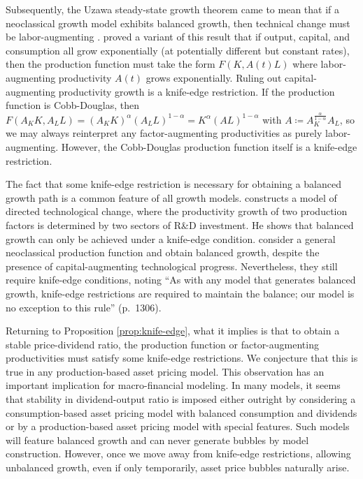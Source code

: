 \documentclass[a4paper,12pt]{article}
\numberwithin{equation}{section}
\theoremstyle{plain}
\begin{document}
Subsequently, the Uzawa steady-state growth theorem came to mean that if a neoclassical growth model exhibits balanced growth, then technical change must be labor-augmenting \citep{JonesScrimgeour2008}. \citet{Schlicht2006} proved a variant of this result that if output, capital, and consumption all grow exponentially (at potentially different but constant rates), then the production function must take the form $F(K,A(t)L)$ where labor-augmenting productivity $A(t)$ grows exponentially. Ruling out capital-augmenting productivity growth is a knife-edge restriction. If the production function is Cobb-Douglas, then $F(A_KK,A_LL)=(A_KK)^\alpha(A_LL)^{1-\alpha}=K^\alpha (AL)^{1-\alpha}$ with $A\coloneqq A_K^\frac{\alpha}{1-\alpha}A_L$, so we may always reinterpret any factor-augmenting productivities as purely labor-augmenting. However, the Cobb-Douglas production function itself is a knife-edge restriction.

The fact that some knife-edge restriction is necessary for obtaining a balanced growth path is a common feature of all growth models. \citet[\S15.6]{Acemoglu2009} constructs a model of directed technological change, where the productivity growth of two production factors is determined by two sectors of R\&D investment. He shows that balanced growth can only be achieved under a knife-edge condition.
\citet*{GrossmanHelpmanOberfieldSampson2017} consider a general neoclassical production function and obtain balanced growth, despite the presence of capital-augmenting technological progress. Nevertheless, they still require knife-edge conditions, noting ``As with any model that generates balanced growth, knife-edge restrictions are required to maintain the balance; our model is no exception to this rule'' (p.~1306).

Returning to Proposition \ref{prop:knife-edge}, what it implies is that to obtain a stable price-dividend ratio, the production function or factor-augmenting productivities must satisfy some knife-edge restrictions. We conjecture that this is true in any production-based asset pricing model. This observation has an important implication for macro-financial modeling. In many models, it seems that stability in dividend-output ratio is imposed either outright by considering a consumption-based asset pricing model with balanced consumption and dividends or by a production-based asset pricing model with special features. Such models will feature balanced growth and can never generate bubbles by model construction. However, once we move away from knife-edge restrictions, allowing unbalanced growth, even if only temporarily, asset price bubbles naturally arise.
\end{document}

